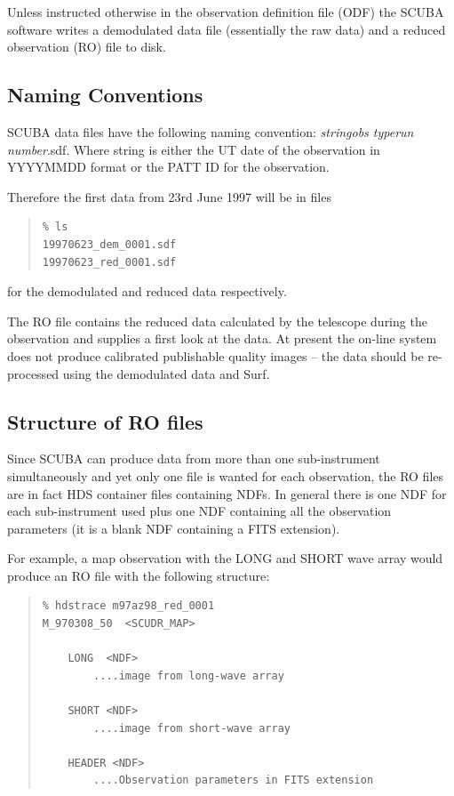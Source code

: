 \documentclass[twoside,11pt]{article}
\newcommand{\scusoft}          {{\sc Surf}}
\newenvironment{myquote}{\begin{quote}\begin{small}}{\end{small}\end{quote}}
\renewcommand{\_}{\texttt{\symbol{95}}}
\begin{document}
Unless instructed otherwise in the observation definition file (ODF) the
SCUBA software writes a demodulated data file (essentially the raw data) and a
reduced observation (RO) file to disk. 

\subsection{Naming Conventions}

SCUBA data files have the following naming convention: {\it string\_obs
type\_run number}.sdf. Where string is either the UT date of the observation
in YYYYMMDD format or the PATT ID for the observation.

Therefore the first data from 23rd June 1997 will be in files
\begin{myquote}
\begin{verbatim}
% ls
19970623_dem_0001.sdf
19970623_red_0001.sdf
\end{verbatim}
\end{myquote}
for the demodulated and reduced data respectively.

The RO file contains the reduced data calculated by the telescope during the
observation and supplies a first look at the data. At present the on-line
system does not produce calibrated publishable quality images -- the data
should be re-processed using the demodulated data and \scusoft.

\subsection{Structure of RO files}

Since SCUBA can produce data from more than one sub-instrument simultaneously
and yet only one file is wanted for each observation, the RO files are in fact
HDS container files containing NDFs. In general there is one NDF for each
sub-instrument used plus one NDF containing all the observation parameters (it
is a blank NDF containing a FITS extension). 

For example, a map observation with the LONG and SHORT wave array would
produce an RO file with the following structure:

\begin{myquote}
\begin{verbatim}
% hdstrace m97az98_red_0001
M_970308_50  <SCUDR_MAP>

    LONG  <NDF>
        ....image from long-wave array

    SHORT <NDF>
        ....image from short-wave array

    HEADER <NDF>
        ....Observation parameters in FITS extension
\end{verbatim}
\end{myquote}
\end{document}
